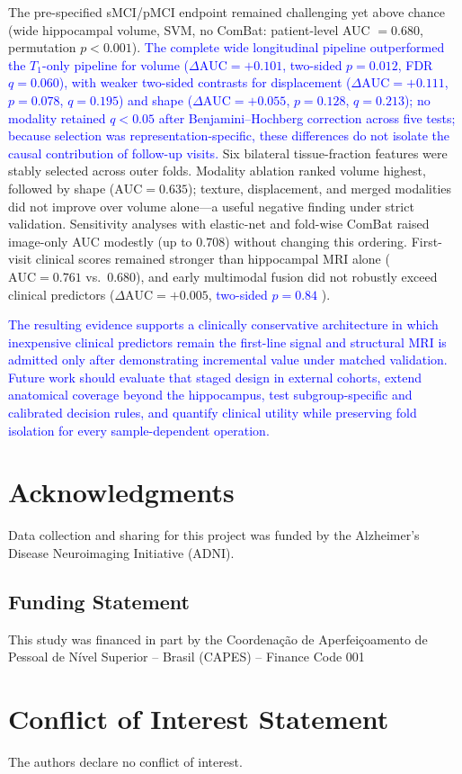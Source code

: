 \documentclass[review]{elsarticle}
\newcommand{\corrigir}[2]{%
	\textcolor{red}{\sout{#1}} %
	\textcolor{blue}{#2}%
}
\begin{document}
	The pre-specified sMCI/pMCI endpoint remained challenging yet above chance (wide hippocampal volume, SVM, no ComBat: patient-level AUC $=0.680$, permutation $p<0.001$). \corrigir{}{The complete wide longitudinal pipeline outperformed the $T_1$-only pipeline for volume ($\Delta\mathrm{AUC}=+0.101$, two-sided $p=0.012$, FDR $q=0.060$), with weaker two-sided contrasts for displacement ($\Delta\mathrm{AUC}=+0.111$, $p=0.078$, $q=0.195$) and shape ($\Delta\mathrm{AUC}=+0.055$, $p=0.128$, $q=0.213$); no modality retained $q<0.05$ after Benjamini--Hochberg correction across five tests;} \corrigir{}{because selection was representation-specific, these differences do not isolate the causal contribution of follow-up visits.} Six bilateral tissue-fraction features were stably selected across outer folds. Modality ablation ranked volume highest, followed by shape ($\mathrm{AUC}=0.635$); texture, displacement, and merged modalities did not improve over volume alone---a useful negative finding under strict validation. Sensitivity analyses with elastic-net and fold-wise ComBat raised image-only AUC modestly (up to $0.708$) without changing this ordering. First-visit clinical scores remained stronger than hippocampal MRI alone ($\mathrm{AUC}=0.761$ vs.\ $0.680$), and early multimodal fusion did not robustly exceed clinical predictors ($\Delta\mathrm{AUC}=+0.005$, \corrigir{}{two-sided $p=0.84$}).
	
	\corrigir{}{The resulting evidence supports a clinically conservative architecture in which inexpensive clinical predictors remain the first-line signal and structural MRI is admitted only after demonstrating incremental value under matched validation. Future work should evaluate that staged design in external cohorts, extend anatomical coverage beyond the hippocampus, test subgroup-specific and calibrated decision rules, and quantify clinical utility while preserving fold isolation for every sample-dependent operation.}
	\section*{Acknowledgments}
	
	Data collection and sharing for this project was funded by the Alzheimer's Disease Neuroimaging Initiative (ADNI).
	
	\subsection*{Funding Statement}
	
	This study was financed in part by the Coordenação de Aperfeiçoamento de Pessoal de Nível Superior – Brasil (CAPES) – Finance Code 001
	
	\section*{Conflict of Interest Statement}
	
	The authors declare no conflict of interest.
	
	
	
	
\end{document}

